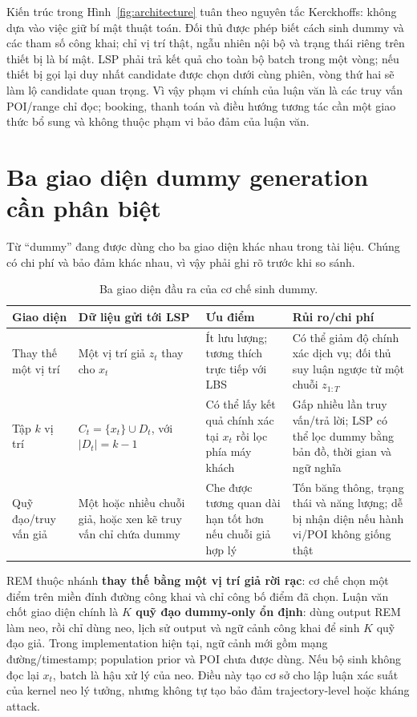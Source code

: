 \documentclass[12pt,a4paper,oneside]{report}
\begin{document}
Kiến trúc trong Hình~\ref{fig:architecture} tuân theo nguyên tắc Kerckhoffs: không dựa vào việc giữ bí mật thuật toán. Đối thủ được phép biết cách sinh dummy và các tham số công khai; chỉ vị trí thật, ngẫu nhiên nội bộ và trạng thái riêng trên thiết bị là bí mật. LSP phải trả kết quả cho toàn bộ batch trong một vòng; nếu thiết bị gọi lại duy nhất candidate được chọn dưới cùng phiên, vòng thứ hai sẽ làm lộ candidate quan trọng. Vì vậy phạm vi chính của luận văn là các truy vấn POI/range chỉ đọc; booking, thanh toán và điều hướng tương tác cần một giao thức bổ sung và không thuộc phạm vi bảo đảm của luận văn.

\section{Ba giao diện dummy generation cần phân biệt}

Từ ``dummy'' đang được dùng cho ba giao diện khác nhau trong tài liệu. Chúng có chi phí và bảo đảm khác nhau, vì vậy phải ghi rõ trước khi so sánh.

\begin{table}[htbp]
\centering
\small
\caption{Ba giao diện đầu ra của cơ chế sinh dummy.}
\label{tab:interfaces}
\begin{tabularx}{\textwidth}{P{3.0cm}Y Y Y}
\toprule
\textbf{Giao diện} & \textbf{Dữ liệu gửi tới LSP} & \textbf{Ưu điểm} & \textbf{Rủi ro/chi phí} \\
\midrule
Thay thế một vị trí & Một vị trí giả $z_t$ thay cho $x_t$ & Ít lưu lượng; tương thích trực tiếp với LBS & Có thể giảm độ chính xác dịch vụ; đối thủ suy luận ngược từ một chuỗi $z_{1:T}$ \\
Tập $k$ vị trí & $C_t=\{x_t\}\cup D_t$, với $|D_t|=k-1$ & Có thể lấy kết quả chính xác tại $x_t$ rồi lọc phía máy khách & Gấp nhiều lần truy vấn/trả lời; LSP có thể lọc dummy bằng bản đồ, thời gian và ngữ nghĩa \\
Quỹ đạo/truy vấn giả & Một hoặc nhiều chuỗi giả, hoặc xen kẽ truy vấn chỉ chứa dummy & Che được tương quan dài hạn tốt hơn nếu chuỗi giả hợp lý & Tốn băng thông, trạng thái và năng lượng; dễ bị nhận diện nếu hành vi/POI không giống thật \\
\bottomrule
\end{tabularx}
\end{table}

REM thuộc nhánh \textbf{thay thế bằng một vị trí giả rời rạc}: cơ chế chọn một điểm trên miền đỉnh đường công khai và chỉ công bố điểm đã chọn. Luận văn chốt giao diện chính là \textbf{$K$ quỹ đạo dummy-only ổn định}: dùng output REM làm neo, rồi chỉ dùng neo, lịch sử output và ngữ cảnh công khai để sinh $K$ quỹ đạo giả. Trong implementation hiện tại, ngữ cảnh mới gồm mạng đường/timestamp; population prior và POI chưa được dùng. Nếu bộ sinh không đọc lại $x_t$, batch là hậu xử lý của neo. Điều này tạo cơ sở cho lập luận xác suất của kernel neo lý tưởng, nhưng không tự tạo bảo đảm trajectory-level hoặc kháng attack.
\end{document}

